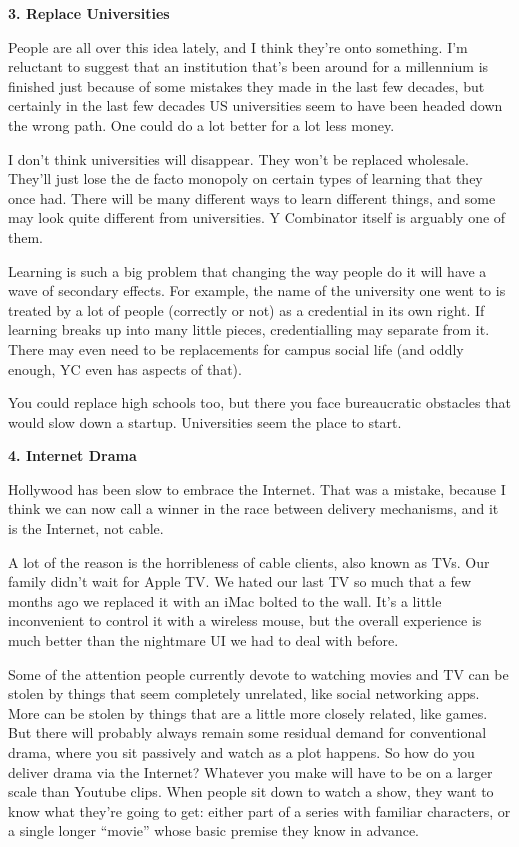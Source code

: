 \documentclass[12pt]{book}
\begin{document}
\textbf{3. Replace Universities}

People are all over this idea lately, and I think they're onto
something. I'm reluctant to suggest that an institution that's been
around for a millennium is finished just because of some mistakes they
made in the last few decades, but certainly in the last few decades US
universities seem to have been headed down the wrong path. One could do
a lot better for a lot less money.

I don't think universities will disappear. They won't be replaced
wholesale. They'll just lose the de facto monopoly on certain types of
learning that they once had. There will be many different ways to learn
different things, and some may look quite different from universities. Y
Combinator itself is arguably one of them.

Learning is such a big problem that changing the way people do it will
have a wave of secondary effects. For example, the name of the
university one went to is treated by a lot of people (correctly or not)
as a credential in its own right. If learning breaks up into many little
pieces, credentialling may separate from it. There may even need to be
replacements for campus social life (and oddly enough, YC even has
aspects of that).

You could replace high schools too, but there you face bureaucratic
obstacles that would slow down a startup. Universities seem the place to
start.

\textbf{4. Internet Drama}

Hollywood has been slow to embrace the Internet. That was a mistake,
because I think we can now call a winner in the race between delivery
mechanisms, and it is the Internet, not cable.

A lot of the reason is the horribleness of cable clients, also known as
TVs. Our family didn't wait for Apple TV. We hated our last TV so much
that a few months ago we replaced it with an iMac bolted to the wall.
It's a little inconvenient to control it with a wireless mouse, but the
overall experience is much better than the nightmare UI we had to deal
with before.

Some of the attention people currently devote to watching movies and TV
can be stolen by things that seem completely unrelated, like social
networking apps. More can be stolen by things that are a little more
closely related, like games. But there will probably always remain some
residual demand for conventional drama, where you sit passively and
watch as a plot happens. So how do you deliver drama via the Internet?
Whatever you make will have to be on a larger scale than Youtube clips.
When people sit down to watch a show, they want to know what they're
going to get: either part of a series with familiar characters, or a
single longer ``movie'' whose basic premise they know in advance.
\end{document}
